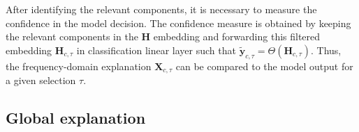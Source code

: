 After identifying the relevant components, it is necessary to measure the confidence in the model decision.
The confidence measure is obtained by keeping the relevant components in the $\mathbf{H}$ embedding and forwarding this filtered embedding $\mathbf{H}_{c,\tau}$ in classification linear layer such that $\tilde{\mathbf{y}}_{c,\tau}=\Theta(\mathbf{H}_{c,\tau})$.
Thus, the frequency-domain explanation $\mathbf{X}_{c,\tau}$ can be compared to the model output for a given selection $\tau$.




\subsection{Global explanation}